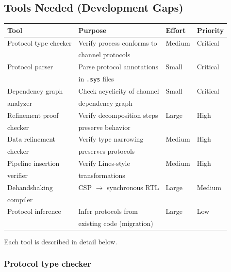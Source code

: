 \documentclass[11pt]{article}
\begin{document}
\subsection{Tools Needed (Development Gaps)}
\label{sec:gaps}

\begin{center}
\begin{tabular}{llll}
\toprule
\textbf{Tool} & \textbf{Purpose} & \textbf{Effort} & \textbf{Priority} \\
\midrule
Protocol type checker & Verify process conforms to & Medium & Critical \\
                      & channel protocols & & \\
Protocol parser       & Parse protocol annotations & Small & Critical \\
                      & in \texttt{.sys} files & & \\
Dependency graph      & Check acyclicity of channel & Small & Critical \\
analyzer              & dependency graph & & \\
Refinement proof      & Verify decomposition steps & Large & High \\
checker               & preserve behavior & & \\
Data refinement       & Verify type narrowing & Medium & High \\
checker               & preserves protocols & & \\
Pipeline insertion    & Verify Lines-style & Medium & High \\
verifier              & transformations & & \\
Dehandshaking         & CSP $\to$ synchronous RTL & Large & Medium \\
compiler              & & & \\
Protocol inference    & Infer protocols from & Large & Low \\
                      & existing code (migration) & & \\
\bottomrule
\end{tabular}
\end{center}

Each tool is described in detail below.

\subsubsection{Protocol type checker}
\end{document}
